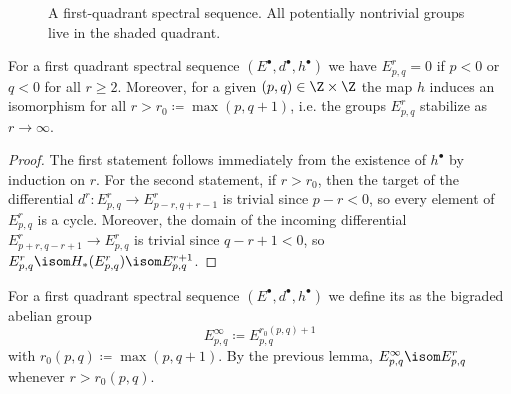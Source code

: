 \begin{figure}[ht]
	\centering
	\caption{A first-quadrant spectral sequence. All potentially nontrivial groups live in the shaded quadrant.}
\end{figure}
\begin{lemma}
	For a first quadrant spectral sequence $(E^\bullet, d^\bullet, h^\bullet)$ we have $E^r_{p, q} = 0$ if $p < 0$ or $q < 0$ for all $r \geq 2$.
	Moreover, for a given $(p, q) \in \Z \times \Z$ the map $h$ induces an isomorphism for all $r > r_0 \coloneq \max(p, q + 1)$, i.e. the groups $E^r_{p, q}$ stabilize as $r \to \infty$.
\end{lemma}
\begin{proof}
	The first statement follows immediately from the existence of $h^\bullet$ by induction on $r$.
	For the second statement, if $r > r_0$, then the target of the differential $d^r\colon E^r_{p, q} \to E^r_{p - r, q + r - 1}$ is trivial since $p - r < 0$, so every element of $E^r_{p, q}$ is a cycle.
	Moreover, the domain of the incoming differential $E^r_{p + r, q - r + 1} \to E^r_{p, q}$ is trivial since $q - r + 1 < 0$, so $E^r_{p, q} \isom H_*(E^r_{p, q}) \isom E^{r + 1}_{p, q}$.
\end{proof}
\begin{definition}
	For a first quadrant spectral sequence $(E^\bullet, d^\bullet, h^\bullet)$ we define its  as the bigraded abelian group
	\begin{equation*}
		E^\infty_{p, q} \coloneq E^{r_0(p, q) + 1}_{p, q}
	\end{equation*}
	with $r_0(p, q) \coloneq \max(p, q + 1)$.
	By the previous lemma, $E^\infty_{p, q} \isom E^r_{p, q}$ whenever $r > r_0(p, q)$.
\end{definition}

